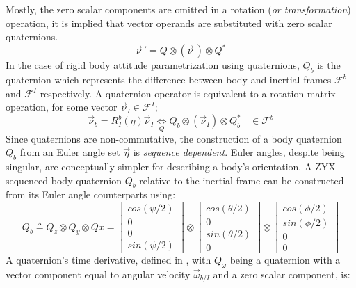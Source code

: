 Mostly, the zero scalar components are omitted in a rotation (\emph{or transformation}) operation, it is implied that vector operands are substituted with zero scalar quaternions.
\begin{equation}\label{eq:quaternion-rotation}
\vec{\nu}\hspace{2pt}'=Q \otimes (\vec{\nu}\hspace{2pt}) \otimes Q^*
\end{equation} 
In the case of rigid body attitude parametrization using quaternions, $Q_b$ is the quaternion which represents the difference between body and inertial frames $\mathcal{F}^b$ and $\mathcal{F}^I$ respectively. A quaternion operator is equivalent to a rotation matrix operation, for some vector $\vec{\nu}_I\in\mathcal{F}^I$;
\begin{equation}
\vec{\nu}_b=R_I^b(\eta)\vec{\nu}_I \underset{Q}{\iff} Q_b \otimes (\vec{\nu}_I) \otimes Q_b^*~~~~\in\mathcal{F}^b
\end{equation}
Since quaternions are non-commutative, the construction of a body quaternion $Q_b$ from an Euler angle set $\vec{\eta}$ is \emph{sequence dependent}. Euler angles, despite being singular, are conceptually simpler for describing a body's orientation. A ZYX sequenced body quaternion $Q_b$ relative to the inertial frame can be constructed from its Euler angle counterparts using:
\begin{equation}\label{eq:quaternion-sequence}
Q_b\triangleq Q_z\otimes Q_y\otimes Qx=\begin{bmatrix}
cos(\psi/2)\\
0\\
0\\
sin(\psi/2)
\end{bmatrix}
\otimes
\begin{bmatrix}
cos(\theta/2)\\
0\\
sin(\theta/2)\\
0
\end{bmatrix}
\otimes
\begin{bmatrix}
cos(\phi/2)\\
sin(\phi/2)\\
0\\
0
\end{bmatrix}
\end{equation}
A quaternion's time derivative, defined in \cite{fullquaternion}, with $Q_\omega$ being a quaternion with a vector component equal to angular velocity $\vec{\omega}_{b/I}$ and a zero scalar component, is:
